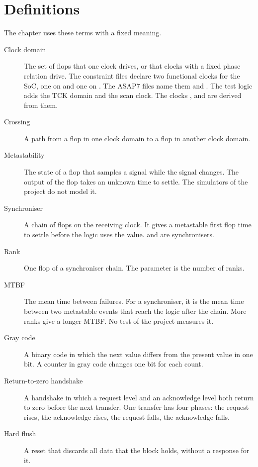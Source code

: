 \section{Definitions}\label{ds:ch:mod-cdc-primitives:definitions}
The chapter uses these terms with a fixed meaning.
\begin{description}
  \item[Clock domain] The set of flops that one clock drives, or that clocks with a fixed phase relation drive. The constraint files declare two functional clocks for the SoC, one on  and one on . The ASAP7 files name them  and . The test logic adds the TCK domain and the scan clock. The clocks ,  and  are derived from them.
  \item[Crossing] A path from a flop in one clock domain to a flop in another clock domain.
  \item[Metastability] The state of a flop that samples a signal while the signal changes. The output of the flop takes an unknown time to settle. The simulators of the project do not model it.
  \item[Synchroniser] A chain of flops on the receiving clock. It gives a metastable first flop time to settle before the logic uses the value.  and  are synchronisers.
  \item[Rank] One flop of a synchroniser chain. The parameter  is the number of ranks.
  \item[MTBF] The mean time between failures. For a synchroniser, it is the mean time between two metastable events that reach the logic after the chain. More ranks give a longer MTBF. No test of the project measures it.
  \item[Gray code] A binary code in which the next value differs from the present value in one bit. A counter in gray code changes one bit for each count.
  \item[Return-to-zero handshake] A handshake in which a request level and an acknowledge level both return to zero before the next transfer. One transfer has four phases: the request rises, the acknowledge rises, the request falls, the acknowledge falls.
  \item[Hard flush] A reset that discards all data that the block holds, without a response for it.
\end{description}

